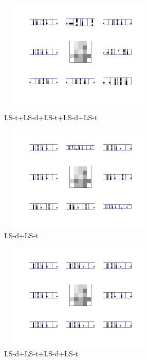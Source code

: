 \documentclass{article}
\begin{document}
\begin{spacing}{1.1}
\begin{enumerate}
\begin{figure}[h]
\begin{minipage}[b]{0.5\textwidth}
    \centering 
    \includegraphics[width=3in,height=2in]{bu_lt_lk_lt.jpg} 
    \caption{LS-t+LS-d+LS-t+LS-d+LS-t}
    \label{fig:by:table} 
  \end{minipage}%
  \begin{minipage}[b]{0.5\textwidth} 
    \centering 
    \includegraphics[width=3in,height=2in]{bu_lk.jpg} 
    \caption{LS-d+LS-t}
    \label{fig:by:table}  
   \end{minipage}%
\end{figure}
\begin{figure}
    \centering 
    \includegraphics[width=3in,height=2in]{bu_lk_lt.jpg} 
    \caption{LS-d+LS-t+LS-d+LS-t}
\end{figure}




\end{enumerate}
\end{spacing}
\end{document}
